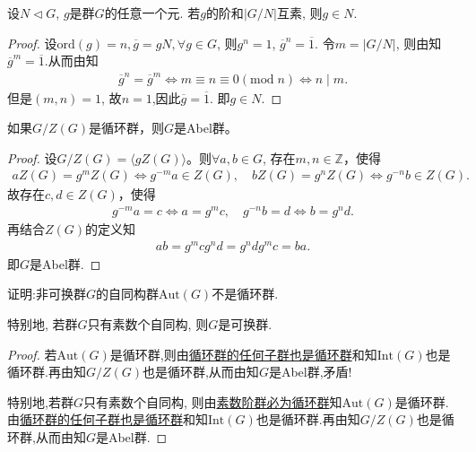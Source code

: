 \documentclass[../../main.tex]{subfiles}%
\begin{document}
\begin{example}
设$N \lhd G$, $g$是群$G$的任意一个元. 若$g$的阶和$|G/N|$互素, 则$g \in N$.
\end{example}
\begin{proof}
设$\text{ord}(g) = n,\overline{g}=gN,\forall g\in G$, 则$g^n = 1$, $\overline{g}^n = \overline{1}$. 令$m = |G/N|$, 则由知$\overline{g}^m = \overline{1}$.从而由知
\begin{align*}
\overline{g}^n=\overline{g}^m\Longleftrightarrow m\equiv n\equiv 0\left( \mathrm{mod}\;n \right) \Longleftrightarrow n\mid m.
\end{align*}
但是$(m,n)=1$, 故$n=1$,因此$\overline{g} = \overline{1}$. 即$g \in N$.
\end{proof}

\begin{proposition}\label{proposition:群商中心循环则必为Abel群}
如果$G/Z(G)$是循环群，则$G$是Abel群。
\end{proposition}
\begin{proof}
设$G/Z(G) = \langle gZ(G)\rangle$。则$\forall a, b \in G$, 存在$m,n\in \mathbb{Z}$，使得
\begin{align*}
aZ(G)=g^mZ(G)\Longleftrightarrow g^{-m}a\in Z(G),\quad bZ(G)=g^nZ(G)\Longleftrightarrow g^{-n}b\in Z(G).
\end{align*}
故存在$c,d\in Z(G)$，使得
\begin{align*}
g^{-m}a=c\Longleftrightarrow a=g^mc,\quad g^{-n}b=d\Longleftrightarrow b=g^nd.
\end{align*}
再结合$Z(G)$的定义知
\begin{align*}
ab=g^mcg^nd=g^ndg^mc=ba.
\end{align*}
即$G$是Abel群.
\end{proof}

\begin{example}
证明:非可换群$G$的自同构群$\mathrm{Aut}(G)$不是循环群. 

特别地, 若群$G$只有素数个自同构, 则$G$是可换群.
\end{example}
\begin{proof}
若$\mathrm{Aut}(G)$是循环群,则由\hyperref[theorem:循环群的任何子群也是循环群]{循环群的任何子群也是循环群}和知$\mathrm{Int}(G)$也是循环群.再由知$G/Z(G)$也是循环群,从而由知$G$是Abel群,矛盾!

特别地,若群$G$只有素数个自同构, 则由\hyperref[proposition:素数阶群必为循环群]{素数阶群必为循环群}知$\mathrm{Aut}(G)$是循环群.由\hyperref[theorem:循环群的任何子群也是循环群]{循环群的任何子群也是循环群}和知$\mathrm{Int}(G)$也是循环群.再由知$G/Z(G)$也是循环群,从而由知$G$是Abel群.
\end{proof}
\end{document}
